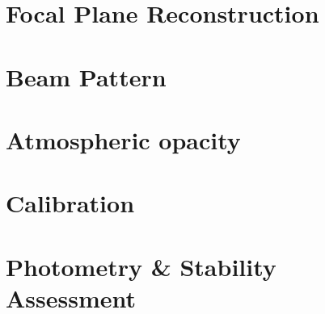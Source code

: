 \documentclass[traditionalabstract]{aa}
\begin{document}
\section{Focal Plane Reconstruction}
\label{se:geometry}


\section{Beam Pattern}
\label{se:beam}


\section{Atmospheric opacity}
\label{se:opacity}


\section{Calibration}
\label{se:calibration}



\section{Photometry \& Stability Assessment}
\label{se:photometry}


\end{document}
